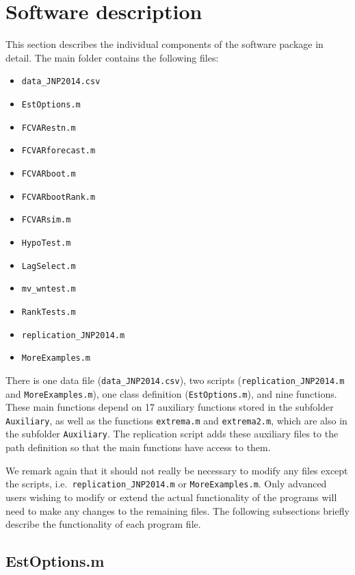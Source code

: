 \documentclass[10pt]{article}
\begin{document}
\section{Software description}
\label{sec programs}

This section describes the individual components of the software package in detail. The main folder contains the following files:

\begin{itemize}
\item \verb|data_JNP2014.csv|
\item \verb|EstOptions.m|
\item \verb|FCVARestn.m|
\item \verb|FCVARforecast.m|
\item \verb|FCVARboot.m|
\item \verb|FCVARbootRank.m|
\item \verb|FCVARsim.m|
\item \verb|HypoTest.m|
\item \verb|LagSelect.m|
\item \verb|mv_wntest.m|
\item \verb|RankTests.m|
\item \verb|replication_JNP2014.m|
\item \verb|MoreExamples.m|
\end{itemize}

There is one data file (\verb|data_JNP2014.csv|), two scripts (\verb|replication_JNP2014.m| and  \verb|MoreExamples.m|), one class definition (\verb|EstOptions.m|), and nine functions. These main functions depend on 17 auxiliary functions stored in the subfolder \verb|Auxiliary|, as well as the functions \verb|extrema.m| and \verb|extrema2.m|, which are also in the subfolder \verb|Auxiliary|. The replication script adds these auxiliary files to the path definition so that the main functions have access to them. 

We remark again that it should not really be necessary to modify any files except the scripts, i.e.\ \verb|replication_JNP2014.m| or \verb|MoreExamples.m|. Only advanced users wishing to modify or extend the actual functionality of the programs will need to make any changes to the remaining files. The following subsections briefly describe the functionality of each program file.


\subsection{EstOptions.m}
\label{sec:estoptions.m}
\lstset{firstnumber=1}
\end{document}
